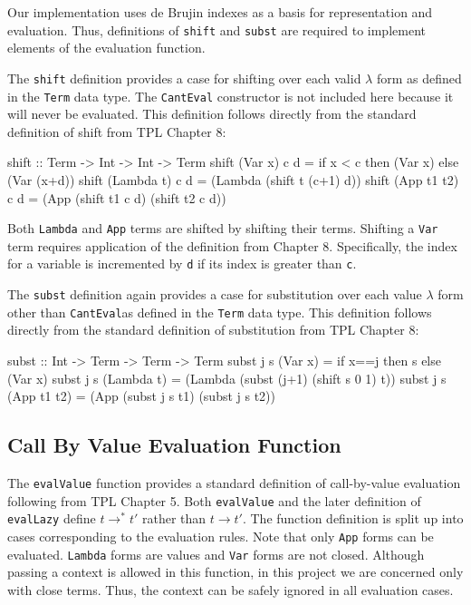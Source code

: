 \documentclass[10pt]{article}
\begin{document}
Our implementation uses de Brujin indexes as a basis for
representation and evaluation.  Thus, definitions of \texttt{shift}
and \texttt{subst} are required to implement elements of the evaluation
function.

The \texttt{shift} definition provides a case for shifting over each
valid $\lambda$ form as defined in the \texttt{Term} data type.  The
\texttt{CantEval} constructor is not included here because it will
never be evaluated.  This definition follows directly from the
standard definition of shift from TPL Chapter 8:

\begin{code}
  shift :: Term -> Int -> Int -> Term
  shift (Var x) c d = if x < c then (Var x) else (Var (x+d))
  shift (Lambda t) c d = (Lambda (shift t (c+1) d))
  shift (App t1 t2) c d = (App (shift t1 c d) (shift t2 c d))
\end{code}

Both \texttt{Lambda} and \texttt{App} terms are shifted by shifting
their terms.  Shifting a \texttt{Var} term requires application of the
definition from Chapter 8.  Specifically, the index for a variable is
incremented by \texttt{d} if its index is greater than \texttt{c}.

The \texttt{subst} definition again provides a case for substitution
over each value $\lambda$ form other than \texttt{CantEval}as defined
in the \texttt{Term} data type.  This definition follows directly from
the standard definition of substitution from TPL Chapter 8:

\begin{code}
  subst :: Int -> Term -> Term -> Term
  subst j s (Var x) = if x==j then s else (Var x)
  subst j s (Lambda t) = (Lambda (subst (j+1) (shift s 0 1) t))
  subst j s (App t1 t2) = (App (subst j s t1) (subst j s t2))
\end{code}

\subsection{Call By Value Evaluation Function}

The \texttt{evalValue} function provides a standard definition of
call-by-value evaluation following from TPL Chapter 5.  Both
\texttt{evalValue} and the later definition of \texttt{evalLazy}
define $t\longrightarrow^* t'$ rather than $t\longrightarrow t'$.  The
function definition is split up into cases corresponding to the
evaluation rules.  Note that only \texttt{App} forms can be evaluated.
\texttt{Lambda} forms are values and \texttt{Var} forms are not
closed.  Although passing a context is allowed in this function, in
this project we are concerned only with close terms.  Thus, the
context can be safely ignored in all evaluation cases.
\end{document}
